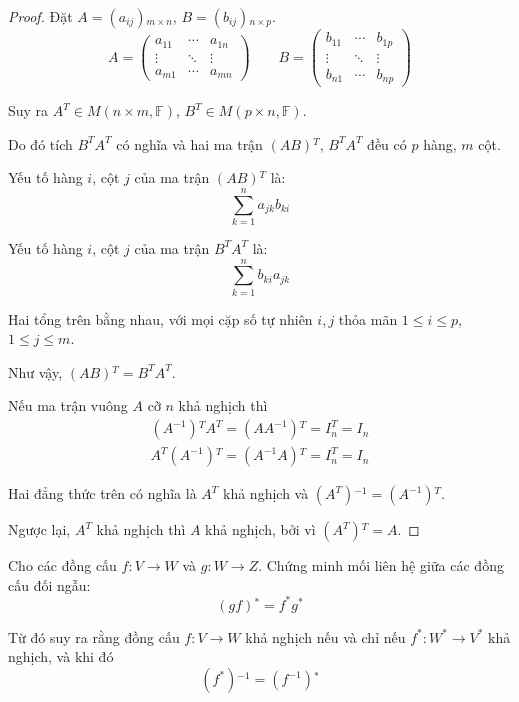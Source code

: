 \documentclass[class=nhvh-linear-algebra,crop=false]{standalone}
\begin{document}
\begin{proof}
    Đặt $A = (a_{ij}){}_{m\times n}$, $B = (b_{ij}){}_{n\times p}$.
    \[
        A =
        \begin{pmatrix}
            a_{11} & \cdots & a_{1n} \\
            \vdots & \ddots & \vdots \\
            a_{m1} & \cdots & a_{mn}
        \end{pmatrix}
        \qquad
        B =
        \begin{pmatrix}
            b_{11} & \cdots & b_{1p} \\
            \vdots & \ddots & \vdots \\
            b_{n1} & \cdots & b_{np}
        \end{pmatrix}
    \]
    \par Suy ra $A^{T}\in M(n\times m, \mathbb{F})$, $B^{T}\in M(p\times n, \mathbb{F})$.
    \par Do đó tích $B^{T}A^{T}$ có nghĩa và hai ma trận $(AB){}^{T}$, $B^{T}A^{T}$ đều có $p$ hàng, $m$ cột.
    \par Yếu tố hàng $i$, cột $j$ của ma trận $(AB){}^{T}$ là:
    \[
        \sum^{n}_{k=1}a_{jk}b_{ki}
    \]
    \par Yếu tố hàng $i$, cột $j$ của ma trận $B^{T}A^{T}$ là:
    \[
        \sum^{n}_{k=1}b_{ki}a_{jk}
    \]
    \par Hai tổng trên bằng nhau, với mọi cặp số tự nhiên $i, j$ thỏa mãn $1\le i\le p$, $1\le j\le m$.
    \par Như vậy, $(AB){}^{T} = B^{T}A^{T}$.
    \bigskip
    \par Nếu ma trận vuông $A$ cỡ $n$ khả nghịch thì
    \[
        \begin{split}
            (A^{-1}){}^{T}A^{T} = (AA^{-1}){}^{T} = I_{n}^{T} = I_{n} \\
            A^{T}(A^{-1}){}^{T} = (A^{-1}A){}^{T} = I_{n}^{T} = I_{n}
        \end{split}
    \]
    \par Hai đẳng thức trên có nghĩa là $A^{T}$ khả nghịch và $(A^{T}){}^{-1} = (A^{-1}){}^{T}$.
    \par Ngược lại, $A^{T}$ khả nghịch thì $A$ khả nghịch, bởi vì $(A^{T}){}^{T} = A$.
\end{proof}

\begin{exercise}
    Cho các đồng cấu $f: V\to W$ và $g: W\to Z$. Chứng minh mối liên hệ giữa các đồng cấu đối ngẫu:
    \[
        (gf){}^{*} = f^{*}g^{*}
    \]
    \par Từ đó suy ra rằng đồng cấu $f: V\to W$ khả nghịch nếu và chỉ nếu $f^{*}: W^{*}\to V^{*}$ khả nghịch, và khi đó
    \[
        (f^{*}){}^{-1} = (f^{-1}){}^{*}
    \]
\end{exercise}
\end{document}
